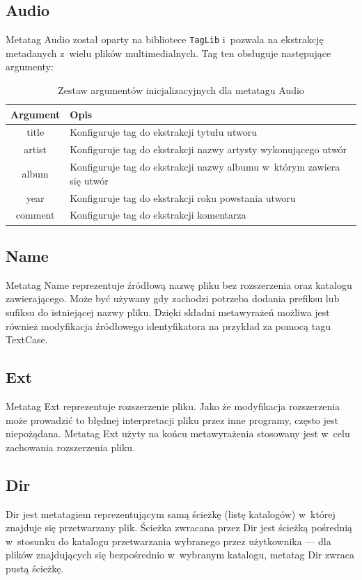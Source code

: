 \subsection{Audio}
Metatag Audio został oparty na bibliotece \texttt{TagLib} i~pozwala na ekstrakcję metadanych z~wielu plików multimedialnych.
Tag ten obsługuje następujące argumenty:
\begin{table}[h]
\begin{center}
\begin{tabular}{| c | p{13cm} |}
\hline
\textbf{Argument} & \textbf{Opis} \\
\hline
title & Konfiguruje tag do ekstrakcji tytułu utworu \\
artist & Konfiguruje tag do ekstrakcji nazwy artysty wykonującego utwór \\
album & Konfiguruje tag do ekstrakcji nazwy albumu w~którym zawiera się utwór \\
year & Konfiguruje tag do ekstrakcji roku powstania utworu \\
comment & Konfiguruje tag do ekstrakcji komentarza \\
\hline

\end{tabular}
\caption{Zestaw argumentów inicjalizacyjnych dla metatagu \textsf{Audio}}
\end{center}
\end{table}

\subsection{Name}
Metatag Name reprezentuje źródłową nazwę pliku bez rozszerzenia oraz katalogu zawierającego. Może być używany gdy zachodzi potrzeba dodania prefiksu lub sufiksu do istniejącej nazwy pliku. Dzięki składni metawyrażeń możliwa jest również modyfikacja źródłowego identyfikatora na przykład za pomocą tagu TextCase.

\subsection{Ext}
Metatag Ext reprezentuje rozszerzenie pliku. Jako że modyfikacja rozszerzenia może prowadzić to błędnej interpretacji pliku przez inne programy, często jest niepożądana. Metatag Ext użyty na końcu metawyrażenia stosowany jest w~celu zachowania rozszerzenia pliku.

\subsection{Dir}
Dir jest metatagiem reprezentującym samą ścieżkę (listę katalogów) w~której znajduje się przetwarzany plik. Ścieżka zwracana przez Dir jest ścieżką pośrednią w~stosunku do katalogu przetwarzania wybranego przez użytkownika --- dla plików znajdujących się bezpośrednio w~wybranym katalogu, metatag Dir zwraca pustą ścieżkę.

